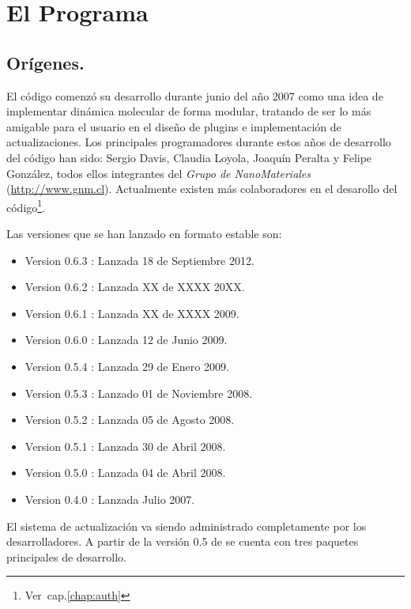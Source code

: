 \chapter{El Programa}
\label{chap:lpmd}

\section{Or\'igenes.}

El c\'odigo {\lpmd} comenz\'o su desarrollo durante junio del a\~no 2007 como una idea de implementar din\'amica molecular de forma modular, tratando de ser lo m\'as amigable para el usuario en el dise\~no de plugins e implementaci\'on de actualizaciones. Los principales programadores durante estos a\~nos de desarrollo del c\'odigo han sido: Sergio Davis, Claudia Loyola, Joaqu\'in Peralta y Felipe Gonz\'alez, todos ellos integrantes del \textit{Grupo de NanoMateriales} (\url{http://www.gnm.cl}). Actualmente existen m\'as colaboradores en el desarollo del c\'odigo\footnote{Ver~cap.\ref{chap:auth}}.

Las versiones que se han lanzado en formato estable son:

\begin{itemize}
 \item Version 0.6.3 : Lanzada 18 de Septiembre 2012.
 \item Version 0.6.2 : Lanzada XX de XXXX 20XX.
 \item Version 0.6.1 : Lanzada XX de XXXX 2009.
 \item Version 0.6.0 : Lanzada 12 de Junio 2009.
 \item Version 0.5.4 : Lanzada 29 de Enero 2009.
 \item Version 0.5.3 : Lanzado 01 de Noviembre 2008.
 \item Version 0.5.2 : Lanzada 05 de Agosto 2008.
 \item Version 0.5.1 : Lanzada 30 de Abril 2008.
 \item Version 0.5.0 : Lanzada 04 de Abril 2008.
 \item Version 0.4.0 : Lanzada Julio 2007.
\end{itemize}

El sistema de actualizaci\'on va siendo administrado completamente por los desarrolladores. A partir de la versi\'on 0.5 de {\lpmd} se cuenta con tres paquetes principales de desarrollo.

